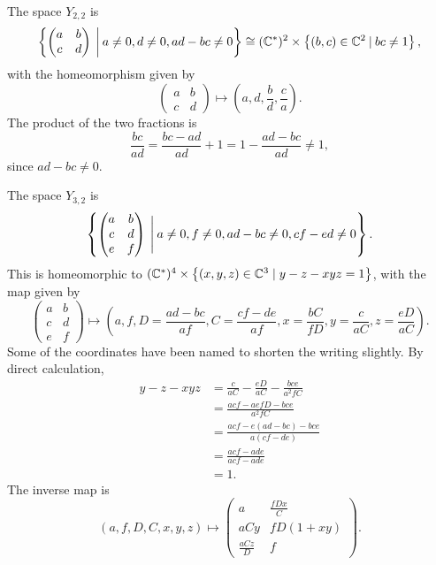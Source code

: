 \begin{example}
  The space $Y_{2,2}$ is
  \[ \left\{ 
    \begin{pmatrix}
      a & b \\
      c & d
    \end{pmatrix} \:\bigg\vert\: a \neq 0, d \neq 0, ad-bc
    \neq 0  \right\} \cong (\mathbb{C}^*)^2 \times \left\{ (b,c)\in\mathbb{C}^2 \:\vert\:
    bc \neq 1 \right\}, \]
  with the homeomorphism given by
  \[
  \begin{pmatrix}
    a & b\\
    c & d
  \end{pmatrix} \mapsto \left(a,d,\frac{b}{d},\frac{c}{a}\right).\]
  The product of the two fractions is
  \[ \frac{bc}{ad} = \frac{bc-ad}{ad} + 1 = 1-\frac{ad-bc}{ad} \neq
  1, \]
  since $ad-bc \neq 0$.
\end{example}

\begin{example}
  The space $Y_{3,2}$ is
  \[\left\{ 
    \begin{pmatrix}
      a &b \\
      c & d \\
      e & f
    \end{pmatrix} \:\Bigg\vert\: a \neq 0, f \neq 0, ad-bc \neq
    0, cf-ed \neq 0 \right\}.
  \]
  This is homeomorphic to $(\mathbb{C}^*)^4\times \left\{ (x,y,z)\in\mathbb{C}^3 \mid
    y-z-xyz = 1 \right\}$, with the map given by
  \[
  \begin{pmatrix}
    a &b \\
    c & d \\
    e & f
  \end{pmatrix} \mapsto
  \left(a, f, D=\frac{ad-bc}{af}, C=\frac{cf-de}{af}, x=\frac{bC}{fD},
    y=\frac{c}{aC}, z=\frac{eD}{aC} \right). \]
  Some of the coordinates have been named to shorten the writing
  slightly. By direct calculation,
  \begin{align*}
    y-z-xyz &= \frac{c}{aC}-\frac{eD}{aC}-\frac{bce}{a^2fC} \\
            &= \frac{acf-aefD-bce}{a^2fC} \\
            &= \frac{acf-e(ad-bc)-bce}{a(cf-de)}  \\
            &= \frac{acf-ade}{acf-ade} \\
            &= 1.
  \end{align*}
  The inverse map is
  \[ (a,f,D,C,x,y,z) \mapsto
  \begin{pmatrix}
    a & \frac{fDx}{C} \\
    aCy & fD(1+xy) \\
    \frac{aCz}{D} & f
  \end{pmatrix}. \]
\end{example}


